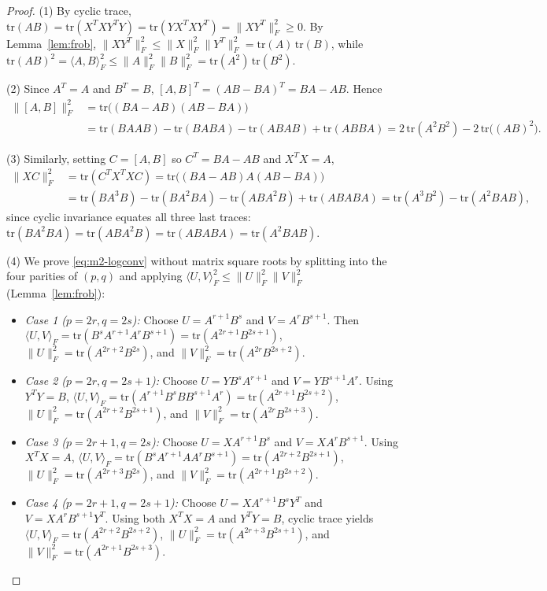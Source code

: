 \documentclass[11pt,a4paper]{article}
\theoremstyle{definition}
\theoremstyle{remark}
\newcommand{\tr}{\mathrm{tr}}
\begin{document}
\begin{proof}
(1) By cyclic trace, $\tr(AB) = \tr(X^T X Y^T Y) = \tr(Y X^T X Y^T) = \|X Y^T\|_F^2 \ge 0$. By Lemma~\ref{lem:frob}, $\|X Y^T\|_F^2 \le \|X\|_F^2 \|Y^T\|_F^2 = \tr(A)\,\tr(B)$, while $\tr(AB)^2 = \langle A, B \rangle_F^2 \le \|A\|_F^2 \|B\|_F^2 = \tr(A^2)\,\tr(B^2)$.

(2) Since $A^T = A$ and $B^T = B$, $[A,B]^T = (AB - BA)^T = BA - AB$. Hence
\begin{align*}
\|[A,B]\|_F^2 &= \tr\bigl((BA - AB)(AB - BA)\bigr) \\
&= \tr(BAAB) - \tr(BABA) - \tr(ABAB) + \tr(ABBA)
= 2\,\tr(A^2 B^2) - 2\,\tr\bigl((AB)^2\bigr).
\end{align*}

(3) Similarly, setting $C = [A,B]$ so $C^T = BA - AB$ and $X^T X = A$,
\begin{align*}
\|X C\|_F^2 &= \tr(C^T X^T X C) = \tr\bigl((BA - AB) A (AB - BA)\bigr) \\
&= \tr(B A^3 B) - \tr(B A^2 B A) - \tr(A B A^2 B) + \tr(A B A B A)
= \tr(A^3 B^2) - \tr(A^2 B A B),
\end{align*}
since cyclic invariance equates all three last traces: $\tr(B A^2 B A) = \tr(A B A^2 B) = \tr(A B A B A) = \tr(A^2 B A B)$.

(4) We prove \eqref{eq:m2-logconv} without matrix square roots by splitting into the four parities of $(p, q)$ and applying $\langle U, V \rangle_F^2 \le \|U\|_F^2 \|V\|_F^2$ (Lemma~\ref{lem:frob}):
\begin{itemize}
\item \emph{Case 1 ($p = 2r, q = 2s$):} Choose $U = A^{r+1} B^s$ and $V = A^r B^{s+1}$. Then $\langle U, V \rangle_F = \tr(B^s A^{r+1} A^r B^{s+1}) = \tr(A^{2r+1} B^{2s+1})$, $\|U\|_F^2 = \tr(A^{2r+2} B^{2s})$, and $\|V\|_F^2 = \tr(A^{2r} B^{2s+2})$.
\item \emph{Case 2 ($p = 2r, q = 2s + 1$):} Choose $U = Y B^s A^{r+1}$ and $V = Y B^{s+1} A^r$. Using $Y^T Y = B$, $\langle U, V \rangle_F = \tr(A^{r+1} B^s B B^{s+1} A^r) = \tr(A^{2r+1} B^{2s+2})$, $\|U\|_F^2 = \tr(A^{2r+2} B^{2s+1})$, and $\|V\|_F^2 = \tr(A^{2r} B^{2s+3})$.
\item \emph{Case 3 ($p = 2r + 1, q = 2s$):} Choose $U = X A^{r+1} B^s$ and $V = X A^r B^{s+1}$. Using $X^T X = A$, $\langle U, V \rangle_F = \tr(B^s A^{r+1} A A^r B^{s+1}) = \tr(A^{2r+2} B^{2s+1})$, $\|U\|_F^2 = \tr(A^{2r+3} B^{2s})$, and $\|V\|_F^2 = \tr(A^{2r+1} B^{2s+2})$.
\item \emph{Case 4 ($p = 2r + 1, q = 2s + 1$):} Choose $U = X A^{r+1} B^s Y^T$ and $V = X A^r B^{s+1} Y^T$. Using both $X^T X = A$ and $Y^T Y = B$, cyclic trace yields $\langle U, V \rangle_F = \tr(A^{2r+2} B^{2s+2})$, $\|U\|_F^2 = \tr(A^{2r+3} B^{2s+1})$, and $\|V\|_F^2 = \tr(A^{2r+1} B^{2s+3})$. \qedhere
\end{itemize}
\end{proof}
\end{document}
